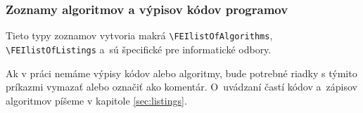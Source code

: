 \documentclass[../../../thesis.tex]{subfiles}
\begin{document}
\subsubsection*{\normalsize Zoznamy algoritmov a výpisov kódov programov}
Tieto typy zoznamov vytvoria makrá \verb|\FEIlistOfAlgorithms|, \verb|\FEIlistOfListings| a~sú špecifické pre informatické odbory.

Ak v práci nemáme výpisy kódov alebo algoritmy,
bude potrebné riadky s týmito príkazmi vymazať alebo označiť ako komentár. O~uvádzaní častí kódov
a~zápisov algoritmov píšeme v kapitole \ref{sec:listings}.
\end{document}
